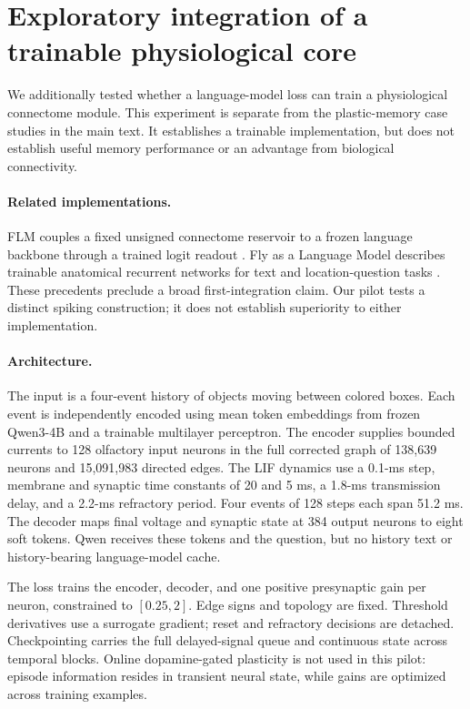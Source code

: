\clearpage
\section{Exploratory integration of a trainable physiological core}
\label{app:physiology-pilot}

We additionally tested whether a language-model loss can train a physiological connectome module. This experiment is separate from the plastic-memory case studies in the main text. It establishes a trainable implementation, but does not establish useful memory performance or an advantage from biological connectivity.

\paragraph{Related implementations.}
FLM couples a fixed unsigned connectome reservoir to a frozen language backbone through a trained logit readout \citep{flm2026}. Fly as a Language Model describes trainable anatomical recurrent networks for text and location-question tasks \citep{flyaslm2026}. These precedents preclude a broad first-integration claim. Our pilot tests a distinct spiking construction; it does not establish superiority to either implementation.

\paragraph{Architecture.}
The input is a four-event history of objects moving between colored boxes. Each event is independently encoded using mean token embeddings from frozen Qwen3-4B and a trainable multilayer perceptron. The encoder supplies bounded currents to 128 olfactory input neurons in the full corrected graph of 138,639 neurons and 15,091,983 directed edges. The LIF dynamics use a 0.1-ms step, membrane and synaptic time constants of 20 and 5 ms, a 1.8-ms transmission delay, and a 2.2-ms refractory period. Four events of 128 steps each span 51.2 ms. The decoder maps final voltage and synaptic state at 384 output neurons to eight soft tokens. Qwen receives these tokens and the question, but no history text or history-bearing language-model cache.

The loss trains the encoder, decoder, and one positive presynaptic gain per neuron, constrained to $[0.25,2]$. Edge signs and topology are fixed. Threshold derivatives use a surrogate gradient; reset and refractory decisions are detached. Checkpointing carries the full delayed-signal queue and continuous state across temporal blocks. Online dopamine-gated plasticity is not used in this pilot: episode information resides in transient neural state, while gains are optimized across training examples.

